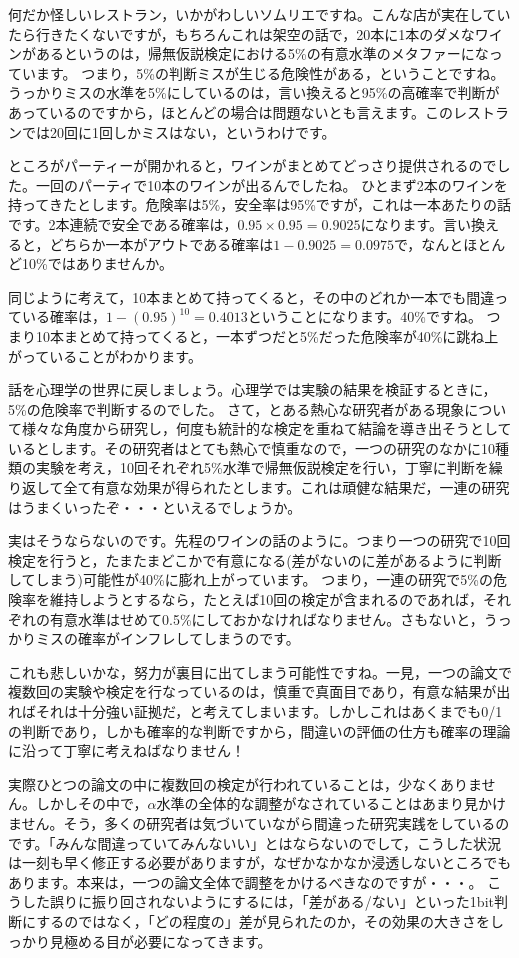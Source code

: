 \documentclass{ltjsarticle}
\begin{document}
何だか怪しいレストラン，いかがわしいソムリエですね。こんな店が実在していたら行きたくないですが，もちろんこれは架空の話で，20本に1本のダメなワインがあるというのは，帰無仮説検定における5\%の有意水準のメタファーになっています。
つまり，5\%の判断ミスが生じる危険性がある，ということですね。
うっかりミスの水準を5\%にしているのは，言い換えると95\%の高確率で判断があっているのですから，ほとんどの場合は問題ないとも言えます。このレストランでは20回に1回しかミスはない，というわけです。

ところがパーティーが開かれると，ワインがまとめてどっさり提供されるのでした。一回のパーティで10本のワインが出るんでしたね。
ひとまず2本のワインを持ってきたとします。危険率は5\%，安全率は95\%ですが，これは一本あたりの話です。2本連続で安全である確率は，$0.95\times 0.95=0.9025$になります。言い換えると，どちらか一本がアウトである確率は$1-0.9025=0.0975$で，なんとほとんど10\%ではありませんか。

同じように考えて，10本まとめて持ってくると，その中のどれか一本でも間違っている確率は，$1-(0.95)^{10}=0.4013$ということになります。40\%ですね。
つまり10本まとめて持ってくると，一本ずつだと5\%だった危険率が40\%に跳ね上がっていることがわかります。

話を心理学の世界に戻しましょう。心理学では実験の結果を検証するときに，5\%の危険率で判断するのでした。
さて，とある熱心な研究者がある現象について様々な角度から研究し，何度も統計的な検定を重ねて結論を導き出そうとしているとします。その研究者はとても熱心で慎重なので，一つの研究のなかに10種類の実験を考え，10回それぞれ5\%水準で帰無仮説検定を行い，丁寧に判断を繰り返して全て有意な効果が得られたとします。これは頑健な結果だ，一連の研究はうまくいったぞ・・・といえるでしょうか。

実はそうならないのです。先程のワインの話のように。つまり一つの研究で10回検定を行うと，たまたまどこかで有意になる(差がないのに差があるように判断してしまう)可能性が40\%に膨れ上がっています。
つまり，一連の研究で5\%の危険率を維持しようとするなら，たとえば10回の検定が含まれるのであれば，それぞれの有意水準はせめて0.5\%にしておかなければなりません。さもないと，うっかりミスの確率がインフレしてしまうのです。

これも悲しいかな，努力が裏目に出てしまう可能性ですね。一見，一つの論文で複数回の実験や検定を行なっているのは，慎重で真面目であり，有意な結果が出ればそれは十分強い証拠だ，と考えてしまいます。しかしこれはあくまでも0/1の判断であり，しかも確率的な判断ですから，間違いの評価の仕方も確率の理論に沿って丁寧に考えねばなりません！

実際ひとつの論文の中に複数回の検定が行われていることは，少なくありません。しかしその中で，$\alpha$水準の全体的な調整がなされていることはあまり見かけません。そう，多くの研究者は気づいていながら間違った研究実践をしているのです。「みんな間違っていてみんないい」とはならないのでして，こうした状況は一刻も早く修正する必要がありますが，なぜかなかなか浸透しないところでもあります。本来は，一つの論文全体で調整をかけるべきなのですが・・・。
こうした誤りに振り回されないようにするには，「差がある/ない」といった1bit判断にするのではなく，「どの程度の」差が見られたのか，その効果の大きさをしっかり見極める目が必要になってきます。
\end{document}
